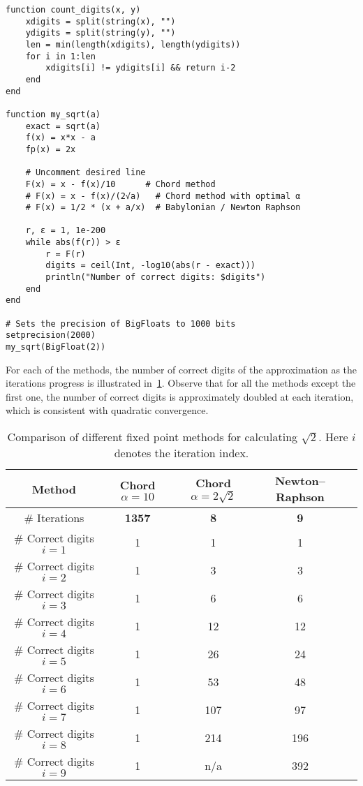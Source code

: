 \begin{verbatim}
function count_digits(x, y)
    xdigits = split(string(x), "")
    ydigits = split(string(y), "")
    len = min(length(xdigits), length(ydigits))
    for i in 1:len
        xdigits[i] != ydigits[i] && return i-2
    end
end

function my_sqrt(a)
    exact = sqrt(a)
    f(x) = x*x - a
    fp(x) = 2x

    # Uncomment desired line
    F(x) = x - f(x)/10      # Chord method
    # F(x) = x - f(x)/(2√a)   # Chord method with optimal α
    # F(x) = 1/2 * (x + a/x)  # Babylonian / Newton Raphson

    r, ε = 1, 1e-200
    while abs(f(r)) > ε
        r = F(r)
        digits = ceil(Int, -log10(abs(r - exact)))
        println("Number of correct digits: $digits")
    end
end

# Sets the precision of BigFloats to 1000 bits
setprecision(2000)
my_sqrt(BigFloat(2))
\end{verbatim}
For each of the methods,
the number of correct digits of the approximation as the iterations progress is illustrated in~\cref{table:numerical_experiment_square_root}.
Observe that for all the methods except the first one,
the number of correct digits is approximately doubled at each iteration,
which is consistent with quadratic convergence.
\begin{table}[ht]
    \centering
    \begin{tabular}{|c|c|c|c|c|}
         \hline
         Method & Chord $\alpha = 10$ & Chord $\alpha = 2 \sqrt{2}$ & Newton--Raphson
         \\ \hline
         \# Iterations & \textbf{1357} & \textbf{8} & \textbf{9}
         \\ \hline
         \# Correct digits $i = 1$ & 1 & 1 & 1
         \\ \hline
         \# Correct digits $i = 2$ & 1 & 3 & 3
         \\ \hline
         \# Correct digits $i = 3$ & 1 & 6 & 6
         \\ \hline
         \# Correct digits $i = 4$ & 1 & 12 & 12
         \\ \hline
         \# Correct digits $i = 5$ & 1 & 26 & 24
         \\ \hline
         \# Correct digits $i = 6$ & 1 & 53 & 48
         \\ \hline
         \# Correct digits $i = 7$ & 1 & 107 & 97
         \\ \hline
         \# Correct digits $i = 8$ & 1 & 214 & 196
         \\ \hline
         \# Correct digits $i = 9$ & 1 & n/a & 392
         \\ \hline
    \end{tabular}
    \caption{%
        Comparison of different fixed point methods for calculating $\sqrt{2}$.
        Here $i$ denotes the iteration index.
    }
    \label{table:numerical_experiment_square_root}
\end{table}
